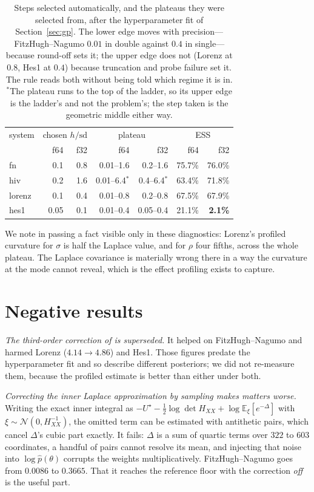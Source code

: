 \documentclass[11pt]{article}
\newcommand{\E}{\mathbb{E}}
\theoremstyle{plain}
\theoremstyle{definition}
\theoremstyle{remark}
\begin{document}
\begin{table}[t]
\centering\small
\begin{tabular}{lrrrrrr}
\toprule
system & \multicolumn{2}{c}{chosen $h/\mathrm{sd}$} & \multicolumn{2}{c}{plateau} & \multicolumn{2}{c}{ESS}\\
& f64 & f32 & f64 & f32 & f64 & f32\\
\midrule
fn     & 0.1  & 0.8  & 0.01--1.6  & 0.2--1.6   & 75.7\% & 76.0\%\\
hiv    & 0.2  & 1.6  & 0.01--6.4$^\ast$ & 0.4--6.4$^\ast$ & 63.4\% & 71.8\%\\
lorenz & 0.1  & 0.4  & 0.01--0.8  & 0.2--0.8   & 67.5\% & 67.9\%\\
hes1   & 0.05 & 0.1  & 0.01--0.4  & 0.05--0.4  & 21.1\% & \textbf{2.1\%}\\
\bottomrule
\end{tabular}
\caption{Steps selected automatically, and the plateaus they were selected from, after the
hyperparameter fit of Section~\ref{sec:gp}. The lower edge moves with precision---FitzHugh--Nagumo
$0.01$ in double against $0.4$ in single---because round-off sets it; the upper edge does not
(Lorenz at $0.8$, Hes1 at $0.4$) because truncation and probe failure set it. The rule reads both
without being told which regime it is in. $^\ast$The plateau runs to the top of the ladder, so its
upper edge is the ladder's and not the problem's; the step taken is the geometric middle either
way.}
\label{tab:chosen}
\end{table}

We note in passing a fact visible only in these diagnostics: Lorenz's profiled curvature for
$\sigma$ is half the Laplace value, and for $\rho$ four fifths, across the whole plateau. The
Laplace covariance is materially wrong there in a way the curvature at the mode cannot reveal,
which is the effect profiling exists to capture.

\section{Negative results}
\label{sec:negative}

\emph{The third-order correction of \cite{companion} is superseded.} It helped on FitzHugh--Nagumo
and harmed Lorenz ($4.14 \to 4.86$) and Hes1. Those figures predate the hyperparameter fit and so
describe different posteriors; we did not re-measure them, because the profiled estimate is better
than either under both.

\emph{Correcting the inner Laplace approximation by sampling makes matters worse.} Writing the
exact inner integral as $-U^\star - \tfrac12\log\det H_{XX} + \log \E_\xi[e^{-\Delta}]$ with
$\xi \sim \mathcal N(0, H_{XX}^{-1})$, the omitted term can be estimated with antithetic pairs,
which cancel $\Delta$'s cubic part exactly. It fails: $\Delta$ is a sum of quartic terms over $322$
to $603$ coordinates, a handful of pairs cannot resolve its mean, and injecting that noise into
$\log\hat p(\theta)$ corrupts the weights multiplicatively. FitzHugh--Nagumo goes from $0.0086$ to
$0.3665$. That it reaches the reference floor with the correction \emph{off} is the useful part.
\end{document}

